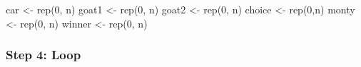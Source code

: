 \documentclass[
]{book}
\newenvironment{Shaded}{\begin{snugshade}}{\end{snugshade}}
\newcommand{\DecValTok}[1]{\textcolor[rgb]{0.00,0.00,0.81}{#1}}
\newcommand{\FunctionTok}[1]{\textcolor[rgb]{0.00,0.00,0.00}{#1}}
\newcommand{\NormalTok}[1]{#1}
\newcommand{\OtherTok}[1]{\textcolor[rgb]{0.56,0.35,0.01}{#1}}
\begin{document}
\begin{Shaded}
\begin{Highlighting}[]
\NormalTok{car }\OtherTok{\textless{}{-}} \FunctionTok{rep}\NormalTok{(}\DecValTok{0}\NormalTok{, n)}
\NormalTok{goat1 }\OtherTok{\textless{}{-}} \FunctionTok{rep}\NormalTok{(}\DecValTok{0}\NormalTok{, n)}
\NormalTok{goat2 }\OtherTok{\textless{}{-}} \FunctionTok{rep}\NormalTok{(}\DecValTok{0}\NormalTok{, n)}
\NormalTok{choice }\OtherTok{\textless{}{-}} \FunctionTok{rep}\NormalTok{(}\DecValTok{0}\NormalTok{,n)}
\NormalTok{monty }\OtherTok{\textless{}{-}} \FunctionTok{rep}\NormalTok{(}\DecValTok{0}\NormalTok{, n)}
\NormalTok{winner }\OtherTok{\textless{}{-}} \FunctionTok{rep}\NormalTok{(}\DecValTok{0}\NormalTok{, n)}
\end{Highlighting}
\end{Shaded}

\hypertarget{step-4-loop}{%
\subsubsection*{Step 4: Loop}\label{step-4-loop}}
\end{document}
